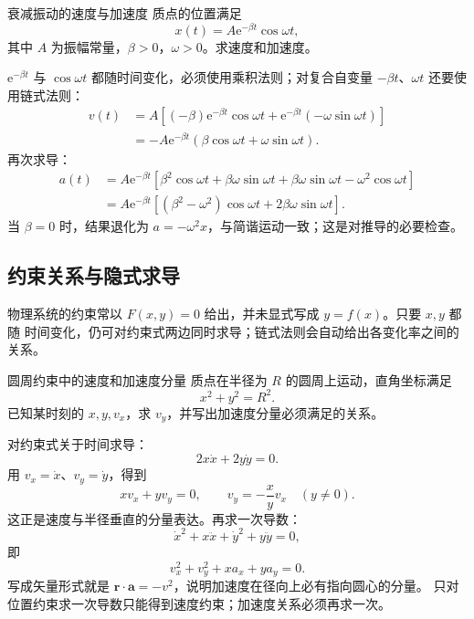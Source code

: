 \documentclass[UTF8,zihao=-4,oneside,openany]{ctexbook}
\numberwithin{equation}{section}
\newcommand{\e}{\mathrm e}
\newcommand{\vect}[1]{\bm{#1}}
\begin{document}
\begin{examplebox}{衰减振动的速度与加速度}
质点的位置满足
\[
  x(t)=A\e^{-\beta t}\cos\omega t,
\]
其中 $A$ 为振幅常量，$\beta>0$，$\omega>0$。求速度和加速度。

\tcblower
$\e^{-\beta t}$ 与 $\cos\omega t$ 都随时间变化，必须使用乘积法则；对复合自变量
$-\beta t$、$\omega t$ 还要使用链式法则：
\begin{align*}
  v(t)
  &=A\left[(-\beta)\e^{-\beta t}\cos\omega t
  +\e^{-\beta t}(-\omega\sin\omega t)\right]\\
  &=-A\e^{-\beta t}
  (\beta\cos\omega t+\omega\sin\omega t).
\end{align*}
再次求导：
\begin{align*}
  a(t)
  &=A\e^{-\beta t}\left[
    \beta^2\cos\omega t+\beta\omega\sin\omega t
    +\beta\omega\sin\omega t-\omega^2\cos\omega t
  \right]\\
  &=A\e^{-\beta t}\left[
    (\beta^2-\omega^2)\cos\omega t
    +2\beta\omega\sin\omega t
  \right].
\end{align*}
当 $\beta=0$ 时，结果退化为 $a=-\omega^2x$，与简谐运动一致；这是对推导的必要检查。
\end{examplebox}

\subsection{约束关系与隐式求导}

物理系统的约束常以 $F(x,y)=0$ 给出，并未显式写成 $y=f(x)$。只要 $x,y$ 都随
时间变化，仍可对约束式两边同时求导；链式法则会自动给出各变化率之间的关系。

\begin{examplebox}{圆周约束中的速度和加速度分量}
质点在半径为 $R$ 的圆周上运动，直角坐标满足
\[
  x^2+y^2=R^2.
\]
已知某时刻的 $x,y,v_x$，求 $v_y$，并写出加速度分量必须满足的关系。

\tcblower
对约束式关于时间求导：
\[
  2x\dot x+2y\dot y=0.
\]
用 $v_x=\dot x$、$v_y=\dot y$，得到
\begin{equation}
  xv_x+yv_y=0,
  \qquad
  v_y=-\frac{x}{y}v_x\quad(y\ne0).
  \label{eq:circle-velocity-constraint}
\end{equation}
这正是速度与半径垂直的分量表达。再求一次导数：
\[
  \dot x^2+x\ddot x+\dot y^2+y\ddot y=0,
\]
即
\begin{equation}
  v_x^2+v_y^2+xa_x+ya_y=0.
  \label{eq:circle-acceleration-constraint}
\end{equation}
写成矢量形式就是 $\vect r\cdot\vect a=-v^2$，说明加速度在径向上必有指向圆心的分量。
只对位置约束求一次导数只能得到速度约束；加速度关系必须再求一次。
\end{examplebox}
\end{document}
